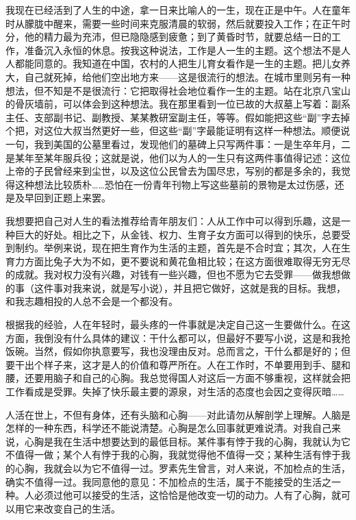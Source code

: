 我现在已经活到了人生的中途，拿一日来比喻人的一生，现在正是中午。人在童年时从朦胧中醒来，需要一些时间来克服清晨的软弱，然后就要投入工作；在正午时分，他的精力最为充沛，但已隐隐感到疲惫；到了黄昏时节，就要总结一日的工作，准备沉入永恒的休息。按我这种说法，工作是人一生的主题。这个想法不是人人都能同意的。我知道在中国，农村的人把生儿育女看作是一生的主题。把儿女养大，自己就死掉，给他们空出地方来——这是很流行的想法。在城市里则另有一种想法，但不知是不是很流行：它把取得社会地位看作一生的主题。站在北京八宝山的骨灰墙前，可以体会到这种想法。我在那里看到一位已故的大叔墓上写着：副系主任、支部副书记、副教授、某某教研室副主任，等等。假如能把这些“副”字去掉个把，对这位大叔当然更好一些，但这些“副”字最能证明有这样一种想法。顺便说一句，我到美国的公墓里看过，发现他们的墓碑上只写两件事：一是生卒年月，二是某年至某年服兵役；这就是说，他们以为人的一生只有这两件事值得记述：这位上帝的子民曾经来到尘世，以及这位公民曾去为国尽忠，写别的都是多余的，我觉得这种想法比较质朴……恐怕在一份青年刊物上写这些墓前的景物是太过伤感，还是及早回到正题上来罢。 

我想要把自己对人生的看法推荐给青年朋友们：人从工作中可以得到乐趣，这是一种巨大的好处。相比之下，从金钱、权力、生育子女方面可以得到的快乐，总要受到制约。举例来说，现在把生育作为生活的主题，首先是不合时宜；其次，人在生育力方面比兔子大为不如，更不要说和黄花鱼相比较；在这方面很难取得无穷无尽的成就。我对权力没有兴趣，对钱有一些兴趣，但也不愿为它去受罪——做我想做的事（这件事对我来说，就是写小说），并且把它做好，这就是我的目标。我想，和我志趣相投的人总不会是一个都没有。 

根据我的经验，人在年轻时，最头疼的一件事就是决定自己这一生要做什么。在这方面，我倒没有什么具体的建议：干什么都可以，但最好不要写小说，这是和我抢饭碗。当然，假如你执意要写，我也没理由反对。总而言之，干什么都是好的；但要干出个样子来，这才是人的价值和尊严所在。人在工作时，不单要用到手、腿和腰，还要用脑子和自己的心胸。我总觉得国人对这后一方面不够重视，这样就会把工作看成是受罪。失掉了快乐最主要的源泉，对生活的态度也会因之变得灰暗…… 

人活在世上，不但有身体，还有头脑和心胸——对此请勿从解剖学上理解。人脑是怎样的一种东西，科学还不能说清楚。心胸是怎么回事就更难说清。对我自己来说，心胸是我在生活中想要达到的最低目标。某件事有悖于我的心胸，我就认为它不值得一做；某个人有悖于我的心胸，我就觉得他不值得一交；某种生活有悖于我的心胸，我就会以为它不值得一过。罗素先生曾言，对人来说，不加检点的生活，确实不值得一过。我同意他的意见：不加检点的生活，属于不能接受的生活之一种。人必须过他可以接受的生活，这恰恰是他改变一切的动力。人有了心胸，就可以用它来改变自己的生活。 

